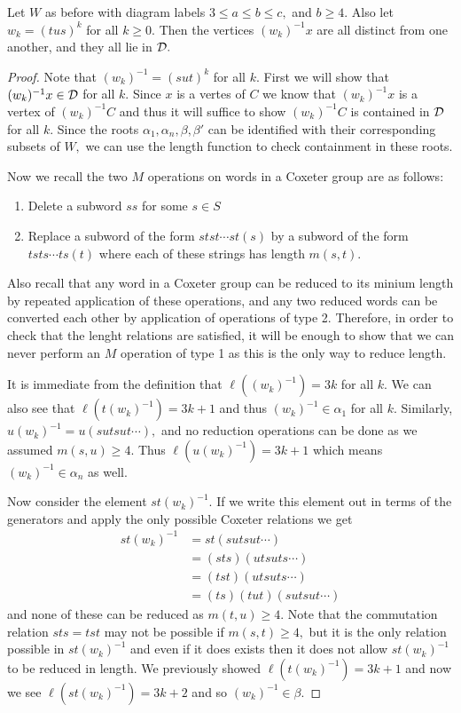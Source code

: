 \documentclass[class=book, crop=false,12 pt]{standalone}
\begin{document}
\begin{lemma}
	\label{infmany}
	Let $W$ as before with diagram labels $3\le a\le b\le c,$ and $b\ge 4.$ Also let $w_k=(tus)^k$ for all $k\ge 0.$ Then the vertices $(w_k)^{-1}x$ are all distinct from one another, and they all lie in $\mathcal{D}.$
\end{lemma}
\begin{proof}
	Note that $(w_k)^{-1}=(sut)^k$ for all $k.$ First we will show that $(w_k)^{-1}x\in \mathcal{D}$ for all $k.$ Since $x$ is a vertes of $C$ we know that $(w_k)^{-1}x$ is a vertex of $(w_k)^{-1}C$ and thus it will suffice to show $(w_k)^{-1}C$ is contained in $\mathcal{D}$ for all $k.$ Since the roots $\alpha_1,\alpha_n,\beta,\beta'$ can be identified with their corresponding subsets of $W,$ we can use the length function to check containment in these roots.

Now we recall the two $M$ operations on words in a Coxeter group are as follows:
\begin{enumerate}
	\item Delete a subword $ss$ for some $s\in S$
	\item Replace a subword of the form $stst\cdots st(s)$ by a subword of the form $tsts\cdots ts(t)$ where each of these strings has length $m(s,t).$
\end{enumerate}
Also recall that any word in a Coxeter group can be reduced to its minium length by repeated application of these operations, and any two reduced words can be converted each other by application of operations of type 2. Therefore, in order to check that the lenght relations are satisfied, it will be enough to show that we can never perform an $M$ operation of type 1 as this is the only way to reduce length.

It is immediate from the definition that $\ell((w_k)^{-1})=3k$ for all $k.$ We can also see that $\ell(t(w_k)^{-1})=3k+1$ and thus $(w_k)^{-1}\in \alpha_1$ for all $k.$ Similarly, $u(w_k)^{-1}=u(sutsut\cdots),$ and no reduction operations can be done as we assumed $m(s,u)\ge 4.$ Thus $\ell(u(w_k)^{-1})=3k+1$ which means $(w_k)^{-1}\in \alpha_n$ as well.

	Now consider the element $st(w_k)^{-1}.$ If we write this element out in terms of the generators and apply the only possible Coxeter relations we get
	\begin{align*}
		st(w_k)^{-1}&=st(sutsut\cdots)\\
		     &=(sts)(utsuts\cdots)\\
		     &=(tst)(utsuts\cdots)\\
		     &=(ts)(tut)(sutsut\cdots)
	\end{align*}
	and none of these can be reduced as $m(t,u)\ge 4.$ Note that the commutation relation $sts=tst$ may not be possible if $m(s,t)\ge 4,$ but it is the only relation possible in $st(w_k)^{-1}$ and even if it does exists then it does not allow $st(w_k)^{-1}$ to be reduced in length. We previously showed $\ell(t(w_k)^{-1})=3k+1$ and now we see $\ell(st(w_k)^{-1})=3k+2$ and so $(w_k)^{-1}\in \beta.$


\end{proof}
\end{document}
